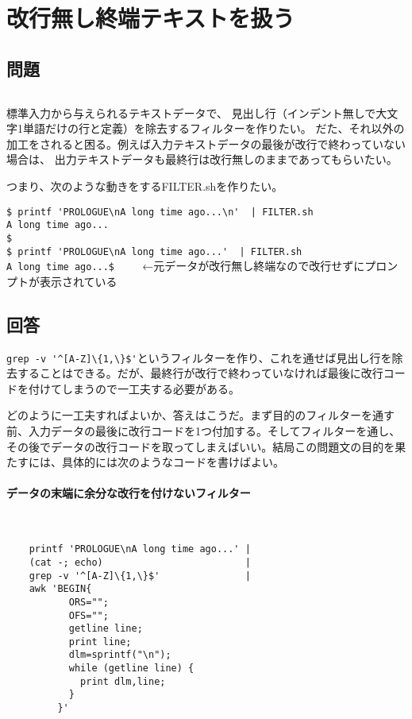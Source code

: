 \section{改行無し終端テキストを扱う}
\label{recipe:nonLFterminated}

\subsection*{問題}
\noindent
$\!\!\!\!\!$
\begin{grshfboxit}{160.0mm}
	標準入力から与えられるテキストデータで、
	見出し行（インデント無しで大文字1単語だけの行と定義）を除去するフィルターを作りたい。
	だた、それ以外の加工をされると困る。例えば入力テキストデータの最後が改行で終わっていない場合は、
	出力テキストデータも最終行は改行無しのままであってもらいたい。

	つまり、次のような動きをするFILTER.shを作りたい。
	\begin{screen}
		\verb!$ printf 'PROLOGUE\nA long time ago...\n'  | FILTER.sh! \return \\
		\verb!A long time ago...! \\
		\verb!$ ! \\
		\verb!$ printf 'PROLOGUE\nA long time ago...'  | FILTER.sh! \return \\
		\verb!A long time ago...$ !　　←元データが改行無し終端なので改行せずにプロンプトが表示されている
	\end{screen}
\end{grshfboxit}

\subsection*{回答}
\verb|grep -v '^[A-Z]\{1,\}$'|というフィルターを作り、これを通せば見出し行を除去することはできる。だが、最終行が改行で終わっていなければ最後に改行コードを付けてしまうので一工夫する必要がある。

どのように一工夫すればよいか、答えはこうだ。まず目的のフィルターを通す前、入力データの最後に改行コードを1つ付加する。そしてフィルターを通し、その後でデータの改行コードを取ってしまえばいい。結局この問題文の目的を果たすには、具体的には次のようなコードを書けばよい。

\paragraph{データの末端に余分な改行を付けないフィルター} 　\\
\begin{frameboxit}{160.0mm}
\begin{verbatim}
	printf 'PROLOGUE\nA long time ago...' |
	(cat -; echo)                         |
	grep -v '^[A-Z]\{1,\}$'               |
	awk 'BEGIN{
	       ORS="";
	       OFS="";
	       getline line;
	       print line;
	       dlm=sprintf("\n");
	       while (getline line) {
	         print dlm,line;
	       }
	     }'
\end{verbatim}
\end{frameboxit}

